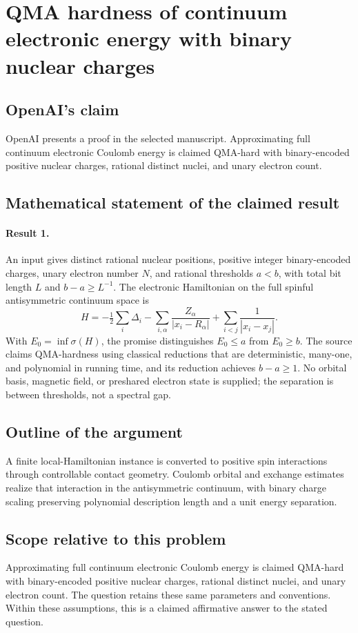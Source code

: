 \documentclass[11pt]{article}
\begin{document}
\section*{QMA hardness of continuum electronic energy with binary nuclear charges}

\subsection{OpenAI's claim}
OpenAI presents a proof in the selected manuscript. Approximating full continuum electronic Coulomb energy is claimed QMA-hard with binary-encoded positive nuclear charges, rational distinct nuclei, and unary electron count.

\subsection{Mathematical statement of the claimed result}
\paragraph{Result 1.} An input gives distinct rational nuclear positions, positive integer binary-encoded charges, unary electron number \(N\), and rational thresholds \(a<b\), with total bit length \(L\) and \(b-a\ge L^{-1}\). The electronic Hamiltonian on the full spinful antisymmetric continuum space is
\[
 H=-\tfrac12\sum_i\Delta_i-\sum_{i,\alpha}\frac{Z_\alpha}{|x_i-R_\alpha|}
 +\sum_{i<j}\frac1{|x_i-x_j|}.
\]
With \(E_0=\inf\sigma(H)\), the promise distinguishes \(E_0\le a\) from \(E_0\ge b\). The source claims QMA-hardness using classical reductions that are deterministic, many-one, and polynomial in running time, and its reduction achieves \(b-a\ge1\). No orbital basis, magnetic field, or preshared electron state is supplied; the separation is between thresholds, not a spectral gap.

\subsection{Outline of the argument}
A finite local-Hamiltonian instance is converted to positive spin interactions through controllable contact geometry. Coulomb orbital and exchange estimates realize that interaction in the antisymmetric continuum, with binary charge scaling preserving polynomial description length and a unit energy separation.

\subsection{Scope relative to this problem}
Approximating full continuum electronic Coulomb energy is claimed QMA-hard with binary-encoded positive nuclear charges, rational distinct nuclei, and unary electron count. The question retains these same parameters and conventions. Within these assumptions, this is a claimed affirmative answer to the stated question.
\end{document}
